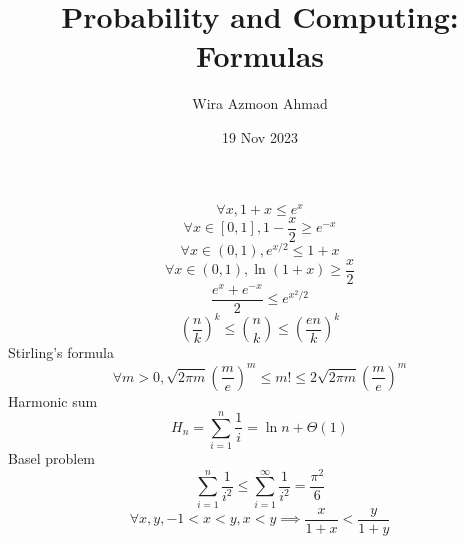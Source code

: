 \documentclass[11pt]{article} %
\title{Probability and Computing: \\Formulas}
\author{Wira Azmoon Ahmad}
\date{19 Nov 2023}
\begin{document}
%
\maketitle





\[\forall x, 1+x\leq e^x\]
\[\forall x\in[0,1], 1-\frac{x}{2}\geq e^{-x}\]
\[\forall x\in(0,1),e^{x/2}\leq 1+x\]
\[\forall x\in(0,1),\ln(1+x)\geq \frac{x}{2}\]
\[\frac{e^x + e^{-x}}{2} \leq e^{x^2/2}\]
\[\left(\frac{n}{k}\right)^k \leq \binom{n}{k} \leq \left(\frac{en}{k}\right)^k\]
Stirling's formula
\[\forall m>0, \sqrt{2\pi m}\left(\frac{m}{e}\right)^m \leq m! 
\leq 2\sqrt{2\pi m}\left(\frac{m}{e}\right)^m\]
Harmonic sum
\[H_n = \sum_{i=1}^n \frac{1}{i} = \ln n + \Theta(1)\]
Basel problem
\[\sum_{i=1}^n \frac{1}{i^2} \leq \sum_{i = 1}^\infty\frac{1}{i^2} = \frac{\pi^2}{6}\]
\[\forall x,y, -1<x<y, x<y\implies \frac{x}{1+x}<\frac{y}{1+y}\]
\end{document}
